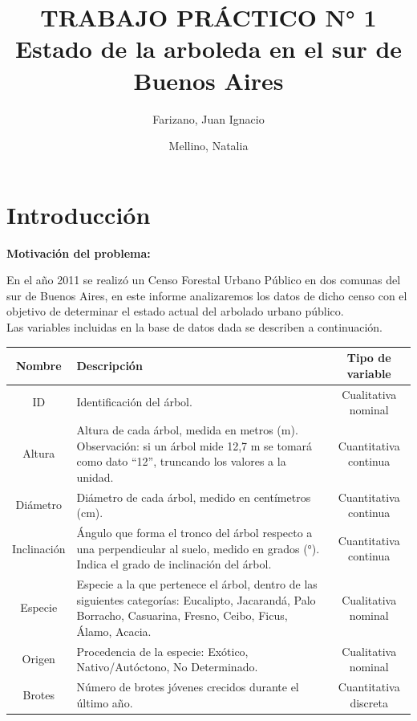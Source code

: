 \documentclass[11pt]{article}
\begin{document}
\title{
  TRABAJO PRÁCTICO N° 1\\
  \large Estado de la arboleda en el sur de Buenos Aires
}
\author{
  Farizano, Juan Ignacio\\
  \and
  Mellino, Natalia
}
\date{}
\maketitle
\newpage

\tableofcontents
\newpage


\section{Introducción}
\textbf{Motivación del problema:}

\begin{justify}
  En el año 2011 se realizó un Censo Forestal Urbano Público en dos
  comunas del sur de Buenos Aires, en este informe analizaremos los datos de
  dicho censo con el objetivo de determinar el estado actual del arbolado urbano 
  público.\\
  Las variables incluidas en la base de datos dada se describen a continuación.
\end{justify}
\begin{center}
  \begin{tabular}{| c | p{9cm} | c |}
    \hline
    \textbf{Nombre} & \textbf{Descripción} & \textbf{Tipo de variable} \\ \hline
    ID & Identificación del árbol. & Cualitativa nominal \\ \hline
    Altura & Altura de cada árbol, medida en metros (m). Observación: si un árbol
    mide 12,7 m se tomará como dato “12”, truncando los valores a la unidad. & 
    Cuantitativa continua \\ \hline
    Diámetro & Diámetro de cada árbol, medido en centímetros (cm). & 
    Cuantitativa continua \\ \hline
    Inclinación & Ángulo que forma el tronco del árbol respecto
    a una perpendicular al suelo, medido en grados (°).
    Indica el grado de inclinación del árbol. & Cuantitativa continua \\ \hline
    Especie & Especie a la que pertenece el árbol, dentro de las siguientes
    categorías: Eucalipto, Jacarandá, Palo Borracho, Casuarina, Fresno, Ceibo,
    Ficus, Álamo, Acacia. & Cualitativa nominal \\ \hline
    Origen & Procedencia de la especie: Exótico, Nativo/Autóctono, 
    No Determinado. & Cualitativa nominal \\ \hline
    Brotes & Número de brotes jóvenes crecidos durante el último año. &
    Cuantitativa discreta \\ \hline
  \end{tabular}
\end{center}
\end{document}

